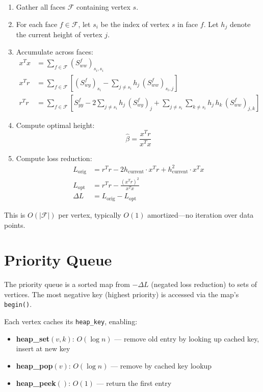 \documentclass{article}
\begin{document}
\begin{enumerate}
    \item Gather all faces $\mathcal{F}$ containing vertex $s$.
    \item For each face $f \in \mathcal{F}$, let $s_i$ be the index of vertex $s$ in face $f$. Let $h_j$ denote the current height of vertex $j$.
    \item Accumulate across faces:
    \begin{align}
        x^T x &= \sum_{f \in \mathcal{F}} (S_{ww}^f)_{s_i, s_i} \\
        x^T r &= \sum_{f \in \mathcal{F}} \left[ (S_{wy}^f)_{s_i} - \sum_{j \neq s_i} h_j \, (S_{ww}^f)_{s_i, j} \right] \\
        r^T r &= \sum_{f \in \mathcal{F}} \left[ S_{yy}^f - 2 \sum_{j \neq s_i} h_j \, (S_{wy}^f)_j + \sum_{j \neq s_i} \sum_{k \neq s_i} h_j \, h_k \, (S_{ww}^f)_{j,k} \right]
    \end{align}
    \item Compute optimal height:
    \begin{equation}
        \hat{\beta} = \frac{x^T r}{x^T x}
    \end{equation}
    \item Compute loss reduction:
    \begin{align}
        L_{\text{orig}} &= r^T r - 2 h_{\text{current}} \cdot x^T r + h_{\text{current}}^2 \cdot x^T x \\
        L_{\text{opt}} &= r^T r - \frac{(x^T r)^2}{x^T x} \\
        \Delta L &= L_{\text{orig}} - L_{\text{opt}}
    \end{align}
\end{enumerate}

This is $O(|\mathcal{F}|)$ per vertex, typically $O(1)$ amortized---no iteration over data points.

\section{Priority Queue}

The priority queue is a sorted map from $-\Delta L$ (negated loss reduction) to sets of vertices. The most negative key (highest priority) is accessed via the map's \texttt{begin()}.

Each vertex caches its \texttt{heap\_key}, enabling:
\begin{itemize}
    \item \textbf{heap\_set}$(v, k)$: $O(\log n)$ --- remove old entry by looking up cached key, insert at new key
    \item \textbf{heap\_pop}$(v)$: $O(\log n)$ --- remove by cached key lookup
    \item \textbf{heap\_peek}$()$: $O(1)$ --- return the first entry
\end{itemize}
\end{document}
